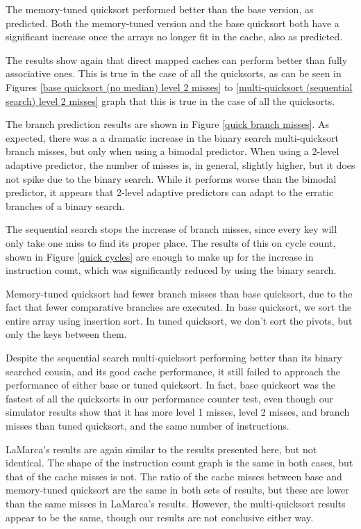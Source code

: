The memory-tuned quicksort performed better than the base version, as predicted.
Both the memory-tuned version and the base quicksort both have a significant
increase once the arrays no longer fit in the cache, also as predicted.

The results show again that direct mapped caches can perform better than fully
associative ones. This is true in the case of all the quicksorts, as can be seen
in Figures \ref{base quicksort (no median) level 2 misses} to
\ref{multi-quicksort (sequential search) level 2 misses} graph that this is true
in the case of all the quicksorts.

The branch prediction results are shown in Figure \ref{quick branch misses}. As
expected, there was a a dramatic increase in the binary search multi-quicksort
branch misses, but only when using a bimodal predictor. When using a 2-level
adaptive predictor, the number of misses is, in general, slightly higher, but it
does not spike due to the binary search. While it performs worse than the
bimodal predictor, it appears that 2-level adaptive predictors can adapt to the
erratic branches of a binary search.

The sequential search stops the increase of branch misses, since every key will
only take one miss to find its proper place. The results of this on cycle
count, shown in Figure \ref{quick cycles} are enough to make up for the increase
in instruction count, which was significantly reduced by using the binary
search.

Memory-tuned quicksort had fewer branch misses than base quicksort, due to the fact
that fewer comparative branches are executed. In base quicksort, we sort the
entire array using insertion sort. In tuned quicksort, we don't sort the pivots,
but only the keys between them.

Despite the sequential search multi-quicksort performing better than its
binary searched cousin, and its good cache performance, it still failed to
approach the performance of either base or tuned quicksort. In fact, base
quicksort was the fastest of all the quicksorts in our performance counter test,
even though our simulator results show that it has more level 1 misses, level 2
misses, and branch misses than tuned quicksort, and the same number of
instructions.

LaMarca's results are again similar to the results presented here, but not
identical. The shape of the instruction count graph is the same in both cases,
but that of the cache misses is not. The ratio of the cache misses between base
and memory-tuned quicksort are the same in both sets of results, but these are lower
than the same misses in LaMarca's results. However, the multi-quicksort results
appear to be the same, though our results are not conclusive either way.


